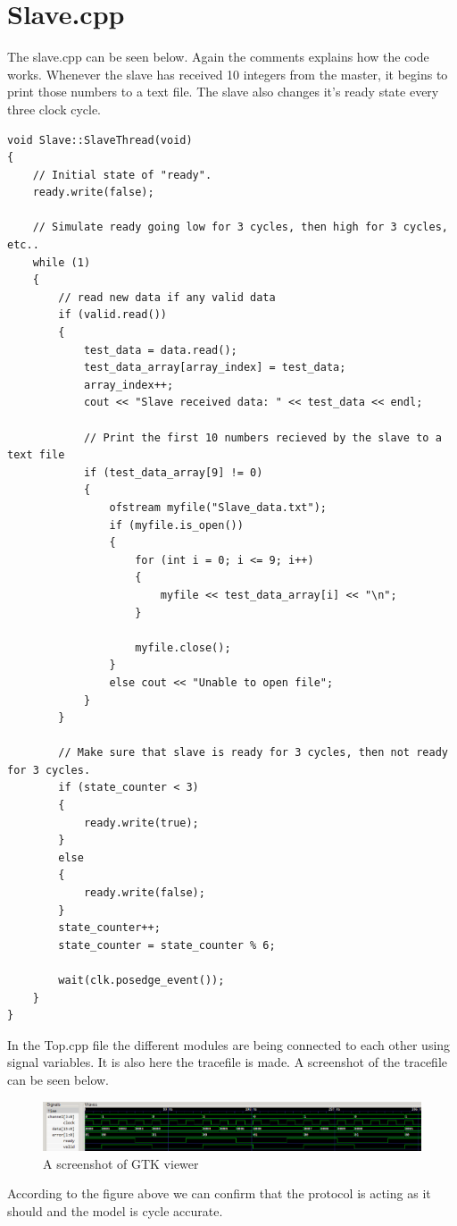 \section{Slave.cpp}
The slave.cpp can be seen below. Again the comments explains how the code works. Whenever the slave has received 10 integers from the master, it begins to print those numbers to a text file. The slave also changes it's ready state every three clock cycle.  

\begin{lstlisting}
void Slave::SlaveThread(void)
{
	// Initial state of "ready".
	ready.write(false);
	
	// Simulate ready going low for 3 cycles, then high for 3 cycles, etc..
	while (1)
	{
		// read new data if any valid data
		if (valid.read())
		{
			test_data = data.read();
			test_data_array[array_index] = test_data;
			array_index++;
			cout << "Slave received data: " << test_data << endl;
			
			// Print the first 10 numbers recieved by the slave to a text file
			if (test_data_array[9] != 0)
			{
				ofstream myfile("Slave_data.txt");
				if (myfile.is_open())
				{
					for (int i = 0; i <= 9; i++)
					{
						myfile << test_data_array[i] << "\n";
					}
					
					myfile.close();
				}
				else cout << "Unable to open file";
			}
		}
		
		// Make sure that slave is ready for 3 cycles, then not ready for 3 cycles.
		if (state_counter < 3)
		{
			ready.write(true);
		}
		else
		{
			ready.write(false);
		}
		state_counter++;
		state_counter = state_counter % 6;
		
		wait(clk.posedge_event());
	}
}
\end{lstlisting}

In the Top.cpp file the different modules are being connected to each other using signal variables. It is also here the tracefile is made. A screenshot of the tracefile can be seen below.

\begin{figure}[H]
	\centering
	\includegraphics[width=\textwidth]{Images/GTK_3_4.png}
	\caption{A screenshot of GTK viewer}
	\label{fig:GTK_Viewer}
\end{figure}

According to the figure above we can confirm that the protocol is acting as it should and the model is cycle accurate.
